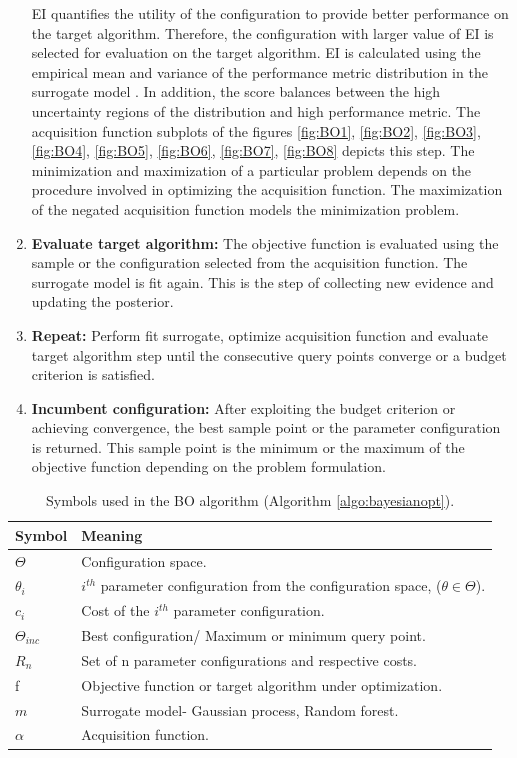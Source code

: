 \begin{enumerate}
EI quantifies the utility of the configuration to provide better performance on the target algorithm. Therefore, the configuration with larger value of EI is selected for evaluation on the target algorithm. EI is calculated using the empirical mean and variance of the performance metric distribution in the surrogate model \cite{EI_analytical} \cite{EI_proper}. In addition, the score balances between the high uncertainty regions of the distribution and high performance metric. The acquisition function subplots of the figures \ref{fig:BO1}, \ref{fig:BO2}, \ref{fig:BO3}, \ref{fig:BO4}, \ref{fig:BO5}, \ref{fig:BO6}, \ref{fig:BO7}, \ref{fig:BO8} depicts this step. The minimization and maximization of a particular problem depends on the procedure involved in optimizing the acquisition function. The maximization of the negated acquisition function models the minimization problem.
\item \textbf{Evaluate target algorithm:} The objective function is evaluated using the sample or the configuration selected from the acquisition function. The surrogate model is fit again. This is the step of collecting new evidence and updating the posterior.
\item \textbf{Repeat:} Perform fit surrogate, optimize acquisition function and evaluate target algorithm step until the consecutive query points converge or a budget criterion is satisfied.
\item \textbf{Incumbent configuration:} After exploiting the budget criterion or achieving convergence, the best sample point or the parameter configuration is returned. This sample point is the minimum or the maximum of the objective function depending on the problem formulation.
\end{enumerate}

\begin{table}[]
\centering
\begin{tabular}{|l|l|}
\hline
\textbf{Symbol} & \textbf{Meaning} \\ \hline
$\Theta$ & Configuration space. \\ \hline
$\theta_i$ & $i^{th}$ parameter configuration from the configuration space, ($\theta \in \Theta$). \\ \hline
$c_i$ & Cost of the $i^{th}$ parameter configuration. \\ \hline
$\Theta_{inc}$ & Best configuration/ Maximum or minimum query point. \\ \hline
$R_n$ & Set of n parameter configurations and respective costs. \\ \hline
f & Objective function or target algorithm under optimization.\\ \hline
$m$ & Surrogate model- Gaussian process, Random forest. \\ \hline
$\alpha$ & Acquisition function. \\ \hline
\end{tabular}
\captionsetup{justification=justified}
\caption[Symbols used in the BO algorithm]{Symbols used in the BO algorithm (Algorithm \ref{algo:bayesianopt}).}
\label{table:BOsymbols}
\end{table}

